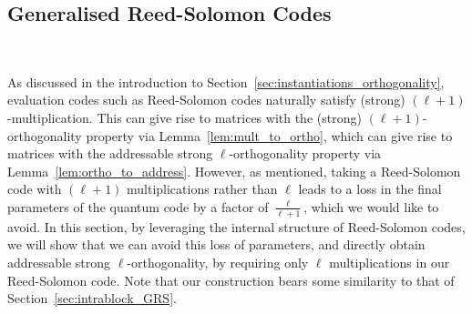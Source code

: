 \documentclass[11pt]{article}
\theoremstyle{definition}
\begin{document}
\subsection{Generalised Reed-Solomon Codes}~\label{sec:GRS}

As discussed in the introduction to Section~\ref{sec:instantiations_orthogonality}, evaluation codes such as Reed-Solomon codes naturally satisfy (strong) $(\ell+1)$-multiplication. This can give rise to matrices with the (strong) $(\ell+1)$-orthogonality property via Lemma~\ref{lem:mult_to_ortho}, which can give rise to matrices with the addressable strong $\ell$-orthogonality property via Lemma~\ref{lem:ortho_to_address}. However, as mentioned, taking a Reed-Solomon code with $(\ell+1)$ multiplications rather than $\ell$ leads to a loss in the final parameters of the quantum code by a factor of $\frac{\ell}{\ell+1}$, which we would like to avoid. In this section, by leveraging the internal structure of Reed-Solomon codes, we will show that we can avoid this loss of parameters, and directly obtain addressable strong $\ell$-orthogonality, by requiring only $\ell$ multiplications in our Reed-Solomon code. Note that our construction bears some similarity to that of Section~\ref{sec:intrablock_GRS}.
\end{document}
